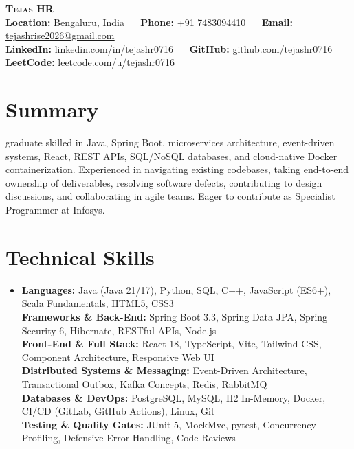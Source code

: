 \documentclass[a4paper,11pt]{article}
\renewcommand{\small}{\fontsize{10.2}{12.6}\selectfont}
\begin{document}
\begin{center}
  \textbf{\Huge\scshape Tejas HR} \\[2pt]
  \fontsize{9.6}{12}\selectfont
  \textbf{Location:} \underline{Bengaluru, India} ~\textbar~ \textbf{Phone:} \href{tel:+917483094410}{\underline{+91 7483094410}} ~\textbar~ \textbf{Email:} \href{mailto:tejashrise2026@gmail.com}{\underline{tejashrise2026@gmail.com}} \\[2pt]
  \textbf{LinkedIn:} \href{https://www.linkedin.com/in/tejashr0716/}{\underline{linkedin.com/in/tejashr0716}} ~\textbar~ \textbf{GitHub:} \href{https://github.com/tejashr0716}{\underline{github.com/tejashr0716}} ~\textbar~ \textbf{LeetCode:} \href{https://leetcode.com/u/tejashr0716/}{\underline{leetcode.com/u/tejashr0716}}
\end{center}
\vspace{-7pt}

\section{Summary}
{\small 2026 graduate skilled in Java, Spring Boot, microservices architecture, event-driven systems, React, REST APIs, SQL/NoSQL databases, and cloud-native Docker containerization. Experienced in navigating existing codebases, taking end-to-end ownership of deliverables, resolving software defects, contributing to design discussions, and collaborating in agile teams. Eager to contribute as Specialist Programmer at Infosys.\par}

\section{Technical Skills}
\begin{itemize}[leftmargin=0.15in,label={},topsep=1pt,itemsep=0pt,parsep=0pt]
  \item {\small
\textbf{Languages:} Java (Java 21/17), Python, SQL, C++, JavaScript (ES6+), Scala Fundamentals, HTML5, CSS3\\[0pt]
\textbf{Frameworks \& Back-End:} Spring Boot 3.3, Spring Data JPA, Spring Security 6, Hibernate, RESTful APIs, Node.js\\[0pt]
\textbf{Front-End \& Full Stack:} React 18, TypeScript, Vite, Tailwind CSS, Component Architecture, Responsive Web UI\\[0pt]
\textbf{Distributed Systems \& Messaging:} Event-Driven Architecture, Transactional Outbox, Kafka Concepts, Redis, RabbitMQ\\[0pt]
\textbf{Databases \& DevOps:} PostgreSQL, MySQL, H2 In-Memory, Docker, CI/CD (GitLab, GitHub Actions), Linux, Git\\[0pt]
\textbf{Testing \& Quality Gates:} JUnit 5, MockMvc, pytest, Concurrency Profiling, Defensive Error Handling, Code Reviews}
\end{itemize}
\end{document}
